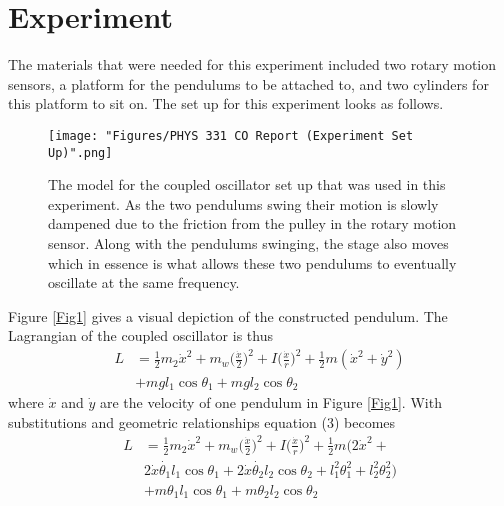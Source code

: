 \documentclass[twocolumn]{article}
\begin{document}
\section*{Experiment}
The materials that were needed for this experiment included two rotary motion sensors, a platform for the pendulums to be attached to, and two cylinders for this platform to sit on. The set up for this experiment looks as follows.
\begin{figure}[htbp]
\begin{center}
\texttt{[image: "Figures/PHYS 331 CO Report (Experiment Set Up)".png]}
\caption{The model for the coupled oscillator set up that was used in this experiment. As the two pendulums swing their motion is slowly dampened due to the friction from the pulley in the rotary motion sensor. Along with the pendulums swinging, the stage also moves which in essence is what allows these two pendulums to eventually oscillate at the same frequency.}
\label{Diagram}
\end{center}
\end{figure}
\newline
Figure \ref{Fig1} gives a visual depiction of the constructed pendulum. The Lagrangian of the coupled oscillator is thus
\begin{equation}\label{3}
\begin{split}
L&=\frac{1}{2}m_{2}\dot{x}^2+m_{w}\Big(\frac{\dot{x}}{2}\Big)^2+I\Big(\frac{\dot{x}}{r}\Big)^2+\frac{1}{2}m(\dot{x}^2+\dot{y}^2) \\&
+mgl_{1}\cos{\theta_1}+mgl_{2}\cos{\theta_2}
\end{split}
\end{equation}
where $\dot{x}$ and $\dot{y}$ are the velocity of one pendulum in Figure \ref{Fig1}. With substitutions and geometric relationships equation (3) becomes 
\begin{equation}\label{4}
\begin{split}
L&=\frac{1}{2}m_{2}\dot{x}^2+m_{w}\Big(\frac{\dot{x}}{2}\Big)^2+I\Big(\frac{\dot{x}}{r}\Big)^2+\frac{1}{2}m\Big(2\dot{x}^2+ \\&
2\dot{x}\dot{\theta_1}l_{1}\cos{\theta_1}+2\dot{x}\dot{\theta_2}l_{2}\cos{\theta_2}+l_{1}^2\theta_{1}^2+l_{2}^2\theta_{2}^2\Big) \\& 
+m\theta_{1}l_{1}\cos{\theta_{1}}+m\theta_{2}l_{2}\cos{\theta_{2}}  \\&
\end{split}
\end{equation}
\end{document}

